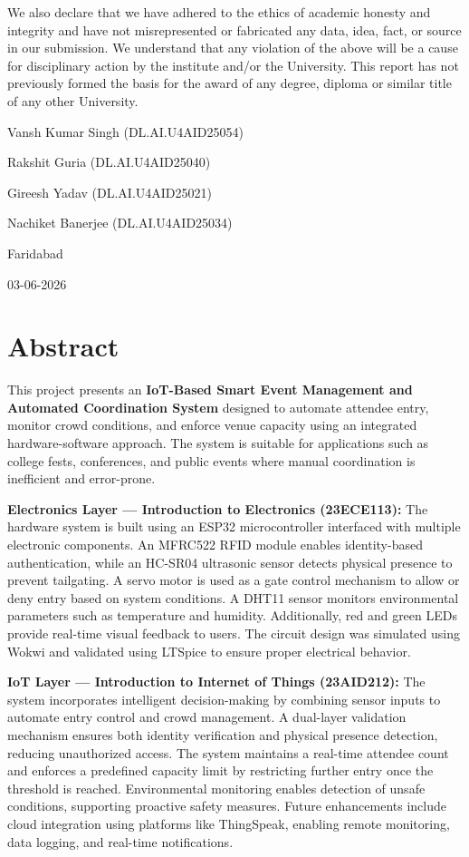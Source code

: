 \documentclass[12pt,a4paper]{report}
\begin{document}
We also declare that we have adhered to the ethics of academic honesty and integrity and have not misrepresented or fabricated any data, idea, fact, or source in our submission. We understand that any violation of the above will be a cause for disciplinary action by the institute and/or the University. This report has not previously formed the basis for the award of any degree, diploma or similar title of any other University.

\vspace{1.5cm}
Vansh Kumar Singh (DL.AI.U4AID25054)

Rakshit Guria (DL.AI.U4AID25040)

Gireesh Yadav (DL.AI.U4AID25021)

Nachiket Banerjee (DL.AI.U4AID25034)

\vspace{1cm}
Faridabad

03-06-2026

\newpage

\chapter*{Abstract}
\thispagestyle{fancy}

This project presents an \textbf{IoT-Based Smart Event Management and Automated Coordination System} designed to automate attendee entry, monitor crowd conditions, and enforce venue capacity using an integrated hardware-software approach. The system is suitable for applications such as college fests, conferences, and public events where manual coordination is inefficient and error-prone.

\textbf{Electronics Layer — Introduction to Electronics (23ECE113):}  
The hardware system is built using an ESP32 microcontroller interfaced with multiple electronic components. An MFRC522 RFID module enables identity-based authentication, while an HC-SR04 ultrasonic sensor detects physical presence to prevent tailgating. A servo motor is used as a gate control mechanism to allow or deny entry based on system conditions. A DHT11 sensor monitors environmental parameters such as temperature and humidity. Additionally, red and green LEDs provide real-time visual feedback to users. The circuit design was simulated using Wokwi and validated using LTSpice to ensure proper electrical behavior.

\textbf{IoT Layer — Introduction to Internet of Things (23AID212):}  
The system incorporates intelligent decision-making by combining sensor inputs to automate entry control and crowd management. A dual-layer validation mechanism ensures both identity verification and physical presence detection, reducing unauthorized access. The system maintains a real-time attendee count and enforces a predefined capacity limit by restricting further entry once the threshold is reached. Environmental monitoring enables detection of unsafe conditions, supporting proactive safety measures. Future enhancements include cloud integration using platforms like ThingSpeak, enabling remote monitoring, data logging, and real-time notifications.
\end{document}
